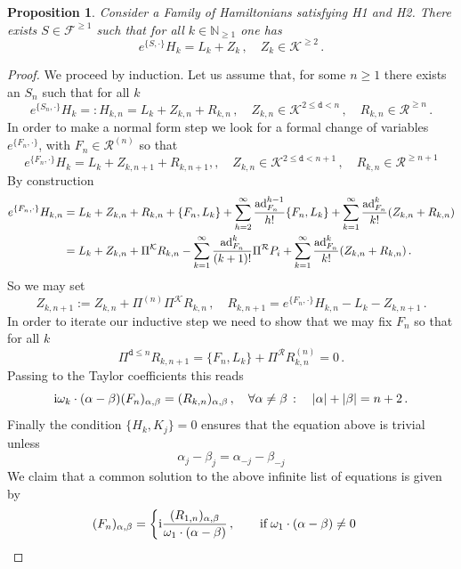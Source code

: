 \documentclass[reqno,11pt]{amsart}
\theoremstyle{plain}
\numberwithin{equation}{section}
\newtheorem{prop}[thm]{Proposition}
\newcommand{\N}{\mathbb{N}}
\newcommand{\ad}{{\rm ad}}
\newcommand{\cF}{{\mathcal F}}
\newcommand{\im}{{\rm i}}
\newcommand{\cR}{{\mathcal R}}
\newcommand{\cK}{{\mathcal K}}
\newcommand{\td}{{\mathtt{d}}}
\newcommand{\al}{{\alpha}}
\newcommand{\bt}{{\beta}}
\begin{document}
{\begin{prop}\label{formal-lin}Consider a Family of Hamiltonians satisfying H1 and H2.
	There exists $S\in  \cF^{\geq 1}$ such that for all $k\in \N_{\geq1}$ one has 
	\[
	e^{\{S,\cdot\}} H_k = L_k  + Z_k\,,\quad Z_k \in \cK^{\geq 2}\,.
	\]
\end{prop}
\begin{proof}
	We proceed by induction. Let us assume that, for some $n\geq 1$ there exists an $S_n$ such that
	for all $k$
	\[
	e^{\{S_n,\cdot\}} H_k=:H_{k,n}= L_k  + Z_{k,n}+ R_{k,n}\,,\quad Z_{k,n} \in \cK^{2\leq  \td < n}\,, \quad R_{k,n} \in \cR^{\geq n}\,.
	\]
	In order to make a normal form step we look for a formal change of variables $e^{\{F_n,\cdot\}}$, with $F_n\in \cR^{(n)}$ so that
	\[
	e^{\{F_n,\cdot\}} H_k = L_k  + Z_{k,n+1}+ R_{k,n+1 },,\quad Z_{k,n} \in \cK^{2\leq  \td < n+1}\,, \quad R_{k,n} \in \cR^{\geq n+1}
	\]
	By construction 
	\begin{align*}
		e^{\{F_n,\cdot\} }H_{k,n} &=L_k+ Z_{k,n} + R_{k,n} + \{F_n, L_k\} + \sum_{h=2}^\infty \frac{\ad_{F_n}^{h-1}}{h!} \{F_n,L_k \}
		+ \sum_{k=1}^\infty \frac{\ad_{F_n}^k}{k!}(Z_{k,n} + R_{k,n}) \\
		&= L_k+ Z_{k,n} + \Pi^\cK R_{k,n}  - \sum_{k=1}^\infty \frac{\ad_{F_n}^{k}}{(k+1)!}\Pi^{\cR}  P_{i}  + \sum_{k=1}^\infty \frac{\ad_{F_n}^k}{k!}(Z_{k,n} + R_{k,n})\,.
	\end{align*}
	So we may set
	\[
	Z_{k,n+1}:= Z_{k,n}+%
	\Pi^{(n)}\Pi^\cK R_{k,n} \,,\quad R_{k,n+1}= e^{\{F_n,\cdot\} }H_{k,n}- L_k - Z_{k,n+1}\,.
	\]
	In order to iterate our inductive step we need to show that we may fix $F_n$ so that for all $k$ 
	\[
	\Pi^{\td\leq  n} R_{k,n+1}= \{F_n,L_k\} + \Pi^\cR R_{k,n}^{(n)} =0\,.
	\]
	Passing to the Taylor coefficients this reads
	\begin{equation}
		\label{homotutte}
		\im \omega_k \cdot (\al-\bt)(F_n)_{\al,\bt} =(R_{k,n})_{\al,\bt} \,,\quad \forall \al\ne \bt\,:\quad |\al|+|\bt| =n+2\,.
	\end{equation}
	Finally the condition $\{H_k,K_j\}=0$ ensures that the equation above is trivial unless
	\begin{equation}
		\label{condk}
		{\al_j-\bt_j = \al_{-j} -\bt_{-j}}
	\end{equation}
	We claim that a  common solution to  the above infinite list of equations is given by
	\begin{equation}
		\label{questo}
		(F_n)_{\al,\bt} =\begin{cases}
			\im \dfrac{(R_{1,n})_{\al,\bt}}{\omega_1 \cdot (\al-\bt)}\,,\qquad \mbox{if}\;  \omega_1 \cdot (\al-\bt)\neq 0\\

\end{cases}
\end{equation}
\end{proof}}
\end{document}

